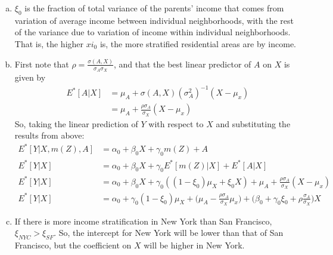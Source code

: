 \documentclass{article}[14pt]
\begin{document}
\begin{enumerate}
\begin{enumerate}[(a)]
        \item $\xi_0$ is the fraction of total variance of the parents' income that comes from variation of average income between individual neighborhoods, with the rest of the variance due to variation of income within individual neighborhoods. That is, the higher $xi_0$ is, the more stratified residential areas are by income.

        \item First note that $\rho = \frac{\sigma(A,X)}{\sigma_A \sigma_X}$, and that the best linear predictor of $A$ on $X$ is given by
        \begin{align*}
            E^*[A|X] &= \mu_A + \sigma(A,X)(\sigma_A^2)^{-1} (X-\mu_x) \\
            &= \mu_A + \frac{\rho \sigma_A}{\sigma_X} (X-\mu_x)
        \end{align*}
        So, taking the linear prediction of $Y$ with respect to $X$ and substituting the results from above:
        \begin{align*}
            E^*[Y|X,m(Z),A] &= \alpha_0 + \beta_0 X + \gamma_0 m(Z) + A \\
            E^*[Y|X] &= \alpha_0 + \beta_0 X + \gamma_0 E^*[m(Z)|X] + E^*[A|X] \\
            E^*[Y|X] &= \alpha_0 + \beta_0 X + \gamma_0((1-\xi_0)\mu_X + \xi_0 X) + \mu_A + \frac{\rho \sigma_A}{\sigma_X} (X-\mu_x) \\
            E^*[Y|X] &= \alpha_0 + \gamma_0(1-\xi_0)\mu_X + \Big( \mu_A - \frac{\rho \sigma_A}{\sigma_X}\mu_x\Big) + \Big( \beta_0 + \gamma_0 \xi_0 + \rho \frac{\sigma_A}{\sigma_X}\Big) X
        \end{align*}

        \item If there is more income stratification in New York than San Francisco, $\xi_{NYC} > \xi_{SF}$. So, the intercept for New York will be lower than that of San Francisco, but the coefficient on $X$ will be higher in New York.

    \end{enumerate}

\end{enumerate}
\end{document}
